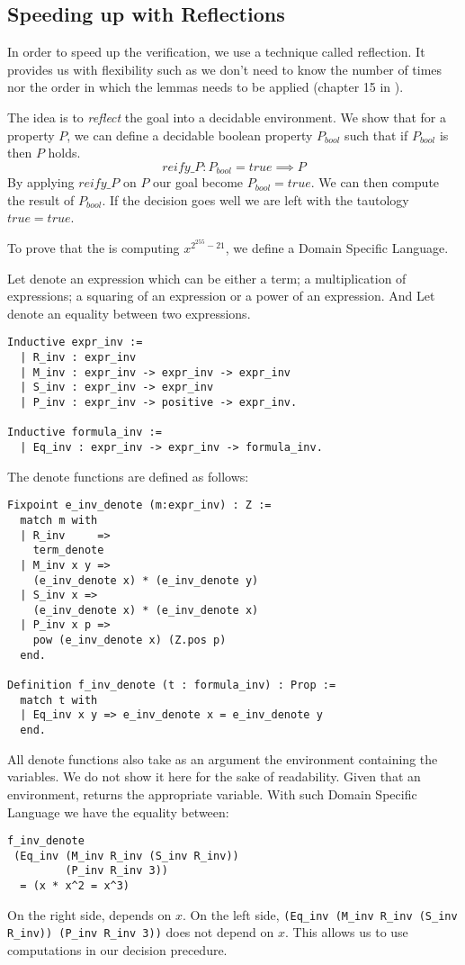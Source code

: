 \subsection{Speeding up with Reflections}

In order to speed up the verification, we use a technique called reflection.
It provides us with flexibility such as we don't need to know the number of
times nor the order in which the lemmas needs to be applied (chapter 15 in \cite{CpdtJFR}).

The idea is to \textit{reflect} the goal into a decidable environment.
We show that for a property $P$, we can define a decidable boolean property
$P_{bool}$ such that if $P_{bool}$ is  then $P$ holds.
$$reify\_P : P_{bool} = true \implies P$$
By applying $reify\_P$ on $P$ our goal become $P_{bool} = true$.
We can then compute the result of $P_{bool}$. If the decision goes well we are
left with the tautology $true = true$.

To prove that the  is computing $x^{2^{255}-21}$,
we define a Domain Specific Language.
\begin{definition}
Let  denote an expression which can be either a term;
a multiplication of expressions; a squaring of an expression or a power of an expression.
And Let  denote an equality between two expressions.
\end{definition}
\begin{lstlisting}[language=Coq]
Inductive expr_inv :=
  | R_inv : expr_inv
  | M_inv : expr_inv -> expr_inv -> expr_inv
  | S_inv : expr_inv -> expr_inv
  | P_inv : expr_inv -> positive -> expr_inv.

Inductive formula_inv :=
  | Eq_inv : expr_inv -> expr_inv -> formula_inv.
\end{lstlisting}
The denote functions are defined as follows:
\begin{lstlisting}[language=Coq]
Fixpoint e_inv_denote (m:expr_inv) : Z :=
  match m with
  | R_inv     =>
    term_denote
  | M_inv x y =>
    (e_inv_denote x) * (e_inv_denote y)
  | S_inv x =>
    (e_inv_denote x) * (e_inv_denote x)
  | P_inv x p =>
    pow (e_inv_denote x) (Z.pos p)
  end.

Definition f_inv_denote (t : formula_inv) : Prop :=
  match t with
  | Eq_inv x y => e_inv_denote x = e_inv_denote y
  end.
\end{lstlisting}
All denote functions also take as an argument the environment containing the variables.
We do not show it here for the sake of readability.
Given that an environment,  returns the appropriate variable.
With such Domain Specific Language we have the equality between:
\begin{lstlisting}[backgroundcolor=\color{white}]
f_inv_denote
 (Eq_inv (M_inv R_inv (S_inv R_inv))
         (P_inv R_inv 3))
  = (x * x^2 = x^3)
\end{lstlisting}
On the right side,  depends on $x$. On the left side,
\texttt{(Eq\_inv (M\_inv R\_inv (S\_inv R\_inv)) (P\_inv R\_inv 3))} does not depend on $x$.
This allows us to use computations in our decision precedure.

